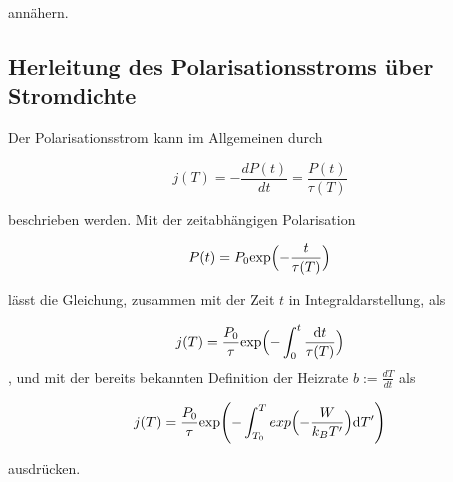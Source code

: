 annähern.

\subsection{Herleitung des Polarisationsstroms über Stromdichte}

Der Polarisationsstrom kann im Allgemeinen durch 

\begin{equation}
    j(T) = -\frac{dP(t)}{dt} = \frac{P(t)}{\tau(T)}
\end{equation}

beschrieben werden. Mit der zeitabhängigen Polarisation 

\begin{equation}
    P(t) = P_0 \text{exp} \Bigl( - \frac{t}{\tau(T)} \Bigr)
\end{equation}

lässt die Gleichung, zusammen mit der Zeit $t$ in Integraldarstellung, als 

\begin{equation}
    j(T) = \frac{P_0}{\tau} \text{exp} \Bigl( - \int_0^t \frac{\text{d}t}{\tau(T)} \Bigr)    
\end{equation}, und mit der bereits bekannten Definition der Heizrate $b := \frac{dT}{dt}$ als 

\begin{equation}
    j(T) = \frac{P_0}{\tau} \text{exp} \Biggl( - \int_{T_0}^T exp \Bigl( -\frac{W}{k_B T'} \Bigr) \text{d}T' \Biggr)
\end{equation}

ausdrücken.